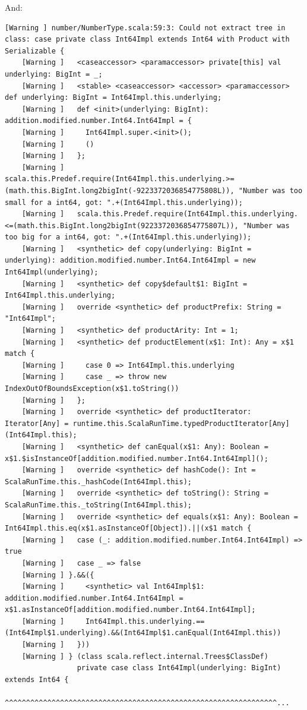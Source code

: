 \documentclass[runningheads]{llncs}
\begin{document}
And:
\begin{lstlisting}[style=stainless]
  [Warning ] number/NumberType.scala:59:3: Could not extract tree in class: case private class Int64Impl extends Int64 with Product with Serializable {
    [Warning ]   <caseaccessor> <paramaccessor> private[this] val underlying: BigInt = _;
    [Warning ]   <stable> <caseaccessor> <accessor> <paramaccessor> def underlying: BigInt = Int64Impl.this.underlying;
    [Warning ]   def <init>(underlying: BigInt): addition.modified.number.Int64.Int64Impl = {
    [Warning ]     Int64Impl.super.<init>();
    [Warning ]     ()
    [Warning ]   };
    [Warning ]   scala.this.Predef.require(Int64Impl.this.underlying.>=(math.this.BigInt.long2bigInt(-9223372036854775808L)), "Number was too small for a int64, got: ".+(Int64Impl.this.underlying));
    [Warning ]   scala.this.Predef.require(Int64Impl.this.underlying.<=(math.this.BigInt.long2bigInt(9223372036854775807L)), "Number was too big for a int64, got: ".+(Int64Impl.this.underlying));
    [Warning ]   <synthetic> def copy(underlying: BigInt = underlying): addition.modified.number.Int64.Int64Impl = new Int64Impl(underlying);
    [Warning ]   <synthetic> def copy$default$1: BigInt = Int64Impl.this.underlying;
    [Warning ]   override <synthetic> def productPrefix: String = "Int64Impl";
    [Warning ]   <synthetic> def productArity: Int = 1;
    [Warning ]   <synthetic> def productElement(x$1: Int): Any = x$1 match {
    [Warning ]     case 0 => Int64Impl.this.underlying
    [Warning ]     case _ => throw new IndexOutOfBoundsException(x$1.toString())
    [Warning ]   };
    [Warning ]   override <synthetic> def productIterator: Iterator[Any] = runtime.this.ScalaRunTime.typedProductIterator[Any](Int64Impl.this);
    [Warning ]   <synthetic> def canEqual(x$1: Any): Boolean = x$1.$isInstanceOf[addition.modified.number.Int64.Int64Impl]();
    [Warning ]   override <synthetic> def hashCode(): Int = ScalaRunTime.this._hashCode(Int64Impl.this);
    [Warning ]   override <synthetic> def toString(): String = ScalaRunTime.this._toString(Int64Impl.this);
    [Warning ]   override <synthetic> def equals(x$1: Any): Boolean = Int64Impl.this.eq(x$1.asInstanceOf[Object]).||(x$1 match {
    [Warning ]   case (_: addition.modified.number.Int64.Int64Impl) => true
    [Warning ]   case _ => false
    [Warning ] }.&&({
    [Warning ]     <synthetic> val Int64Impl$1: addition.modified.number.Int64.Int64Impl = x$1.asInstanceOf[addition.modified.number.Int64.Int64Impl];
    [Warning ]     Int64Impl.this.underlying.==(Int64Impl$1.underlying).&&(Int64Impl$1.canEqual(Int64Impl.this))
    [Warning ]   }))
    [Warning ] } (class scala.reflect.internal.Trees$ClassDef)
                 private case class Int64Impl(underlying: BigInt) extends Int64 {
                 ^^^^^^^^^^^^^^^^^^^^^^^^^^^^^^^^^^^^^^^^^^^^^^^^^^^^^^^^^^^^^^^^...
\end{lstlisting}
\end{document}
